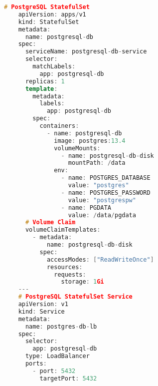   \begin{lstlisting}[language=C++,frame=tb,caption={Deployment und Service von PostgreSQL als Datenbank für Keycloak},label=lst:DeploymentundServicevonPostgres]
    # PostgreSQL StatefulSet
    apiVersion: apps/v1
    kind: StatefulSet
    metadata:
      name: postgresql-db
    spec:
      serviceName: postgresql-db-service
      selector:
        matchLabels:
          app: postgresql-db
      replicas: 1
      template:
        metadata:
          labels:
            app: postgresql-db
        spec:
          containers:
            - name: postgresql-db
              image: postgres:13.4
              volumeMounts:
                - name: postgresql-db-disk
                  mountPath: /data
              env:
                - name: POSTGRES_DATABASE
                  value: "postgres"
                - name: POSTGRES_PASSWORD
                  value: "postgrespw"
                - name: PGDATA
                  value: /data/pgdata
      # Volume Claim
      volumeClaimTemplates:
        - metadata:
            name: postgresql-db-disk
          spec:
            accessModes: ["ReadWriteOnce"]
            resources:
              requests:
                storage: 1Gi
    ---
    # PostgreSQL StatefulSet Service
    apiVersion: v1
    kind: Service
    metadata:
      name: postgres-db-lb
    spec:
      selector:
        app: postgresql-db
      type: LoadBalancer
      ports:
        - port: 5432
          targetPort: 5432            
  \end{lstlisting}
  \bigskip